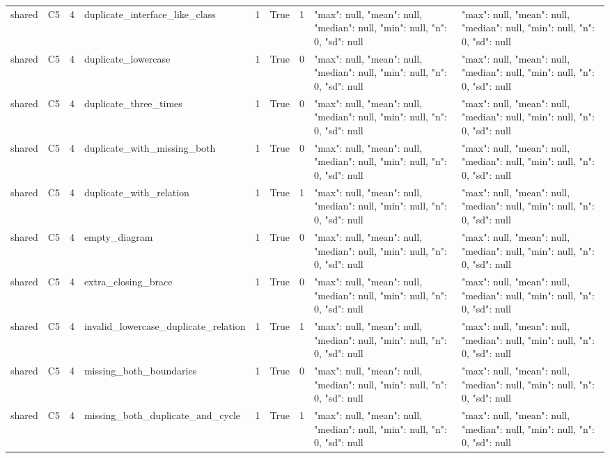 \begin{tabular}{lllllllll}
shared & C5 & 4 & duplicate\_interface\_like\_class & 1 & True & 1 & {"max": null, "mean": null, "median": null, "min": null, "n": 0, "sd": null} & {"max": null, "mean": null, "median": null, "min": null, "n": 0, "sd": null} \\
shared & C5 & 4 & duplicate\_lowercase & 1 & True & 0 & {"max": null, "mean": null, "median": null, "min": null, "n": 0, "sd": null} & {"max": null, "mean": null, "median": null, "min": null, "n": 0, "sd": null} \\
shared & C5 & 4 & duplicate\_three\_times & 1 & True & 0 & {"max": null, "mean": null, "median": null, "min": null, "n": 0, "sd": null} & {"max": null, "mean": null, "median": null, "min": null, "n": 0, "sd": null} \\
shared & C5 & 4 & duplicate\_with\_missing\_both & 1 & True & 0 & {"max": null, "mean": null, "median": null, "min": null, "n": 0, "sd": null} & {"max": null, "mean": null, "median": null, "min": null, "n": 0, "sd": null} \\
shared & C5 & 4 & duplicate\_with\_relation & 1 & True & 1 & {"max": null, "mean": null, "median": null, "min": null, "n": 0, "sd": null} & {"max": null, "mean": null, "median": null, "min": null, "n": 0, "sd": null} \\
shared & C5 & 4 & empty\_diagram & 1 & True & 0 & {"max": null, "mean": null, "median": null, "min": null, "n": 0, "sd": null} & {"max": null, "mean": null, "median": null, "min": null, "n": 0, "sd": null} \\
shared & C5 & 4 & extra\_closing\_brace & 1 & True & 0 & {"max": null, "mean": null, "median": null, "min": null, "n": 0, "sd": null} & {"max": null, "mean": null, "median": null, "min": null, "n": 0, "sd": null} \\
shared & C5 & 4 & invalid\_lowercase\_duplicate\_relation & 1 & True & 1 & {"max": null, "mean": null, "median": null, "min": null, "n": 0, "sd": null} & {"max": null, "mean": null, "median": null, "min": null, "n": 0, "sd": null} \\
shared & C5 & 4 & missing\_both\_boundaries & 1 & True & 0 & {"max": null, "mean": null, "median": null, "min": null, "n": 0, "sd": null} & {"max": null, "mean": null, "median": null, "min": null, "n": 0, "sd": null} \\
shared & C5 & 4 & missing\_both\_duplicate\_and\_cycle & 1 & True & 1 & {"max": null, "mean": null, "median": null, "min": null, "n": 0, "sd": null} & {"max": null, "mean": null, "median": null, "min": null, "n": 0, "sd": null} \\

\end{tabular}
